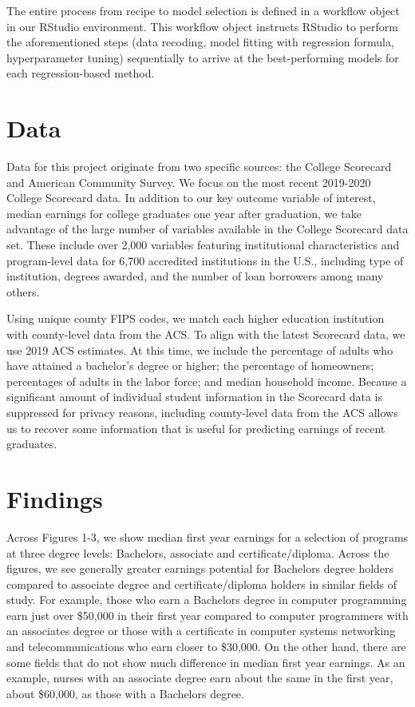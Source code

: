 \documentclass[a4paper, 12pt]{article}
\begin{document}
The entire process from recipe to model selection is defined in a
workflow object in our RStudio environment. This workflow object
instructs RStudio to perform the aforementioned steps (data recoding,
model fitting with regression formula, hyperparameter tuning)
sequentially to arrive at the best-performing models for each
regression-based method.


\section*{Data}

Data for this project originate from two specific sources: the College
Scorecard and American Community Survey. We focus on the most recent
2019-2020 College Scorecard data. In addition to our key outcome
variable of interest, median earnings for college graduates one year
after graduation, we take advantage of the large number of variables
available in the College Scorecard data set. These include over 2,000
variables featuring institutional characteristics and program-level
data for 6,700 accredited institutions in the U.S., including type of
institution, degrees awarded, and the number of loan borrowers among
many others.

Using unique county FIPS codes, we match each higher education
institution with county-level data from the ACS. To align with the
latest Scorecard data, we use 2019 ACS estimates. At this time, we
include the percentage of adults who have attained a bachelor's degree
or higher; the percentage of homeowners; percentages of adults in the
labor force; and median household income. Because a significant amount
of individual student information in the Scorecard data is suppressed
for privacy reasons, including county-level data from the ACS allows
us to recover some information that is useful for predicting earnings
of recent graduates.

\section*{Findings}

Across Figures 1-3, we show median first year earnings for a selection
of programs at three degree levels: Bachelors, associate and
certificate/diploma. Across the figures, we see generally greater
earnings potential for Bachelors degree holders compared to associate
degree and certificate/diploma holders in similar fields of study. For
example, those who earn a Bachelors degree in computer programming
earn just over \$50,000 in their first year compared to computer
programmers with an associates degree or those with a certificate in
computer systems networking and telecommunications who earn closer to
\$30,000. On the other hand, there are some fields that do not show
much difference in median first year earnings. As an example, nurses
with an associate degree earn about the same in the first year, about
\$60,000, as those with a Bachelors degree.
\end{document}
